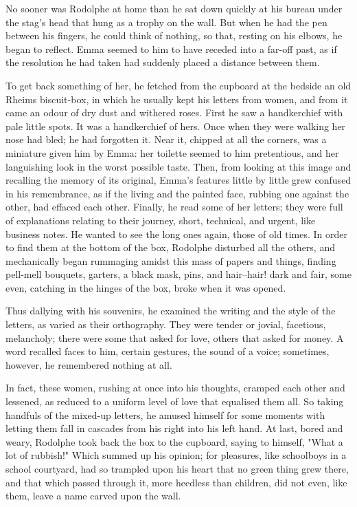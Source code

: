 \documentclass{tufte-book}
\begin{document}
No sooner was Rodolphe at home than he sat down quickly at his bureau
under the stag's head that hung as a trophy on the wall. But when he had
the pen between his fingers, he could think of nothing, so that, resting
on his elbows, he began to reflect. Emma seemed to him to have receded
into a far-off past, as if the resolution he had taken had suddenly
placed a distance between them.

To get back something of her, he fetched from the cupboard at the
bedside an old Rheims biscuit-box, in which he usually kept his letters
from women, and from it came an odour of dry dust and withered
roses. First he saw a handkerchief with pale little spots. It was a
handkerchief of hers. Once when they were walking her nose had bled; he
had forgotten it. Near it, chipped at all the corners, was a miniature
given him by Emma: her toilette seemed to him pretentious, and her
languishing look in the worst possible taste. Then, from looking at this
image and recalling the memory of its original, Emma's features little
by little grew confused in his remembrance, as if the living and the
painted face, rubbing one against the other, had effaced each other.
Finally, he read some of her letters; they were full of explanations
relating to their journey, short, technical, and urgent, like business
notes. He wanted to see the long ones again, those of old times. In
order to find them at the bottom of the box, Rodolphe disturbed all the
others, and mechanically began rummaging amidst this mass of papers and
things, finding pell-mell bouquets, garters, a black mask, pins, and
hair--hair! dark and fair, some even, catching in the hinges of the box,
broke when it was opened.

Thus dallying with his souvenirs, he examined the writing and the style
of the letters, as varied as their orthography. They were tender or
jovial, facetious, melancholy; there were some that asked for love,
others that asked for money. A word recalled faces to him, certain
gestures, the sound of a voice; sometimes, however, he remembered
nothing at all.

In fact, these women, rushing at once into his thoughts, cramped each
other and lessened, as reduced to a uniform level of love that equalised
them all. So taking handfuls of the mixed-up letters, he amused himself
for some moments with letting them fall in cascades from his right into
his left hand. At last, bored and weary, Rodolphe took back the box to
the cupboard, saying to himself, "What a lot of rubbish!" Which summed
up his opinion; for pleasures, like schoolboys in a school courtyard,
had so trampled upon his heart that no green thing grew there, and that
which passed through it, more heedless than children, did not even, like
them, leave a name carved upon the wall.
\end{document}
